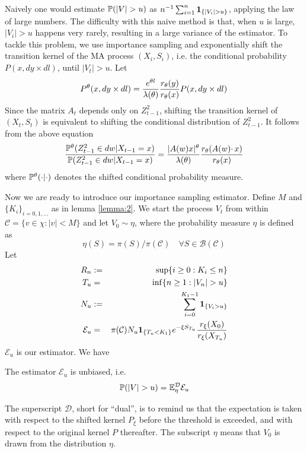 Naively one would estimate $\P(|V| > u)$ as
$n^{-1} \sum_{i=1}^n \1{|V_i| > u}$, applying the law of large
numbers. The difficulty with this naive method is that, when $u$ is
large, $|V_i| > u$ happens very rarely, resulting in a large variance
of the estimator. To tackle this problem, we use importance sampling
and exponentially shift the transition kernel of the MA process
$(X_i, S_i)$, i.e. the conditional probability $P(x, dy \times dl)$,
until $|V_t| > u$. Let
\[
P^\theta(x, dy \times dl)
=
{e^{\theta l} \over \lambda(\theta)}
{r_\theta(y) \over r_\theta(x)}
P(x, dy \times dl)
\]
Since the matrix $A_t$ depends only on $Z_{t-1}^2$, shifting the
transition kernel of $(X_t, S_t)$ is equivalent to shifting the
conditional distribution of $Z_{t-1}^2$. It follows from the above
equation
\begin{equation}
  \label{eq:sampling}
  {
    \P^\theta(Z_{t-1}^2 \in dw | X_{t-1} = x)
    \over
    \P(Z_{t-1}^2 \in dw | X_{t-1} = x)
  } = {|A(w) x|^\theta \over \lambda(\theta)}
  {
    r_\theta (A(w) \cdotp x)
    \over
    r_\theta(x)
  }
\end{equation}
where $\P^\theta(\cdot | \cdot)$ denotes the shifted conditional
probability measure.

Now we are ready to introduce our importance sampling estimator.
Define $M$ and $\{K_i\}_ {i=0,1,\dots}$ as in lemma \ref{lemma:2}.
We start the process $V_t$ from within
$\mathcal C = \{v \in \chi: |v| < M\}$
and let $V_0 \sim \eta$, where the probability
measure $\eta$ is defined as
\[
\eta(S) = \pi(S) / \pi(\mathcal C)
\quad \forall S \in \mathcal B(\mathcal C)
\]
Let
\begin{eqnarray*}
  R_n &:=& \sup\{i \geq 0: K_i \leq n\} \\
  T_u &=& \inf\{n \geq 1: |V_n| > u\} \\
  N_u &:=& \sum_{i=0}^{K_1 - 1} \1{V_i > u} \\
  \mathcal E_u &=& \pi(\mathcal C)
  N_u \1{T_u < K_1} e^{-\xi S_{T_u}}
  {r_\xi(X_0) \over r_\xi(X_{T_u})}
\end{eqnarray*}
$\mathcal E_u$ is our estimator. We have
\begin{theorem}
  \label{thrm:consistency}
  The estimator $\mathcal E_u$ is unbiased, i.e.
  \begin{equation}
    \label{eq:fbf}
    \P(|V| > u) = \E_\eta^{\mathcal D} \mathcal E_u
  \end{equation}
\end{theorem}
The superscript $\mathcal D$, short for ``dual'', is to remind us
that the expectation is taken with respect to the shifted kernel
$P_\xi$ before the threshold is exceeded, and with respect to the
original kernel $P$ thereafter. The subscript $\eta$ means that
$V_0$ is drawn from the distribution $\eta$.


